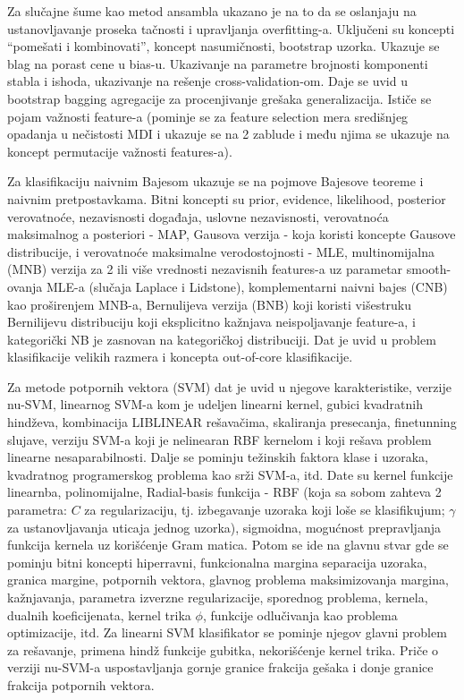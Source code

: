 \documentclass[fontsize=12bp, paper=a4]{scrarticle}
\begin{document}
\vbox{}


Za slučajne šume kao metod ansambla ukazano je na to da se oslanjaju na ustanovljavanje proseka tačnosti i upravljanja overfitting-a. Uključeni su koncepti ``pomešati i kombinovati'', koncept nasumičnosti, bootstrap uzorka. Ukazuje se blag na porast   cene u bias-u.  Ukazivanje na parametre brojnosti komponenti stabla i ishoda, ukazivanje na rešenje cross-validation-om. Daje se uvid u bootstrap bagging agregacije za procenjivanje grešaka generalizacija. Ističe se pojam važnosti feature-a (pominje se za feature selection mera središnjeg opadanja u nečistosti MDI i ukazuje se na 2 zablude i među njima se ukazuje na koncept permutacije važnosti features-a). 

\vbox{}


Za klasifikaciju naivnim Bajesom ukazuje se na pojmove Bajesove teoreme i naivnim pretpostavkama. Bitni koncepti su prior, evidence, likelihood, posterior verovatnoće, nezavisnosti događaja, uslovne nezavisnosti, verovatnoća maksimalnog a posteriori - MAP, Gausova verzija - koja koristi koncepte Gausove distribucije, i verovatnoće maksimalne verodostojnosti - MLE, multinomijalna (MNB) verzija za 2 ili više vrednosti nezavisnih features-a uz parametar smooth-ovanja MLE-a (slučaja Laplace i Lidstone), komplementarni naivni bajes (CNB) kao proširenjem MNB-a, Bernulijeva verzija (BNB) koji koristi višestruku Bernilijevu distribuciju koji eksplicitno kažnjava neispoljavanje feature-a, i kategorički NB je zasnovan na kategoričkoj distribuciji. Dat je uvid u problem klasifikacije velikih razmera i koncepta out-of-core klasifikacije.

\vbox{}


Za metode potpornih vektora (SVM) dat je uvid u njegove karakteristike, verzije nu-SVM, linearnog SVM-a kom je udeljen linearni kernel, gubici kvadratnih hindževa, kombinacija  LIBLINEAR rešavačima, skaliranja presecanja, finetunning slujave, verziju SVM-a koji je nelinearan RBF kernelom i koji rešava problem linearne nesaparabilnosti. Dalje se pominju težinskih faktora klase i uzoraka, kvadratnog programerskog problema kao srži SVM-a, itd. Date su kernel funkcije linearnba, polinomijalne, Radial-basis funkcija - RBF (koja sa sobom zahteva 2 parametra: $C$ za regularizaciju, tj. izbegavanje uzoraka koji loše se klasifikujum; $\gamma$ za ustanovljavanja uticaja jednog uzorka), sigmoidna, mogućnost prepravljanja funkcija kernela uz korišćenje Gram matica. Potom se ide na glavnu stvar gde se pominju bitni koncepti hiperravni, funkcionalna margina separacija uzoraka, granica margine, potpornih vektora, glavnog problema maksimizovanja margina, kažnjavanja, parametra izverzne regularizacije, sporednog problema, kernela, dualnih koeficijenata, kernel trika $\phi$, funkcije odlučivanja kao problema optimizacije, itd. Za linearni SVM klasifikator se pominje njegov glavni problem za rešavanje, primena hindž funkcije gubitka, nekorišćenje kernel trika. Priče o verziji nu-SVM-a uspostavljanja gornje granice frakcija gešaka i donje granice frakcija potpornih vektora.
\end{document}
